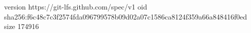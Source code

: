 version https://git-lfs.github.com/spec/v1
oid sha256:f6c48c7c3f2574fda096799578b09d02a07c1586ca8124f359a66a848416f0ed
size 174916
